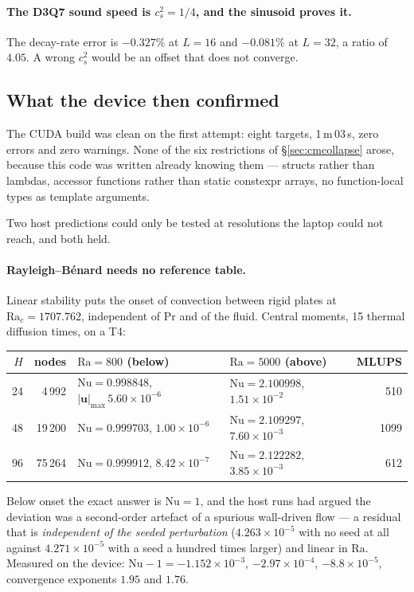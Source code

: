 \documentclass[11pt,a4paper]{article}
\newcommand{\cs}{c_s}
\newcommand{\uu}{\bm{u}}
\newcommand{\e}[1]{\times 10^{#1}}
\begin{document}
\paragraph{The D3Q7 sound speed is $\cs^2 = 1/4$, and the sinusoid proves it.}
The decay-rate error is $-0.327\%$ at $L=16$ and $-0.081\%$ at $L=32$, a ratio of
$4.05$. A wrong $\cs^2$ would be an offset that does not converge.

\subsection{What the device then confirmed}

The CUDA build was clean on the first attempt: eight targets, 1\,m\,03\,s, zero
errors and zero warnings. None of the six restrictions of \S\ref{sec:cmcollapse}
arose, because this code was written already knowing them --- structs rather than
lambdas, accessor functions rather than static constexpr arrays, no
function-local types as template arguments.

Two host predictions could only be tested at resolutions the laptop could not
reach, and both held.

\paragraph{Rayleigh--B\'enard needs no reference table.} Linear stability puts
the onset of convection between rigid plates at $\mathrm{Ra}_c = 1707.762$,
independent of $\mathrm{Pr}$ and of the fluid. Central moments, 15 thermal
diffusion times, on a T4:

\begin{center}\small
\begin{tabular}{rrllr}
\toprule
$H$ & nodes & $\mathrm{Ra}=800$ (below) & $\mathrm{Ra}=5000$ (above) & MLUPS \\
\midrule
24 & 4\,992  & $\mathrm{Nu}=0.998848$, $|\uu|_{\max}\,5.60\e{-6}$ & $\mathrm{Nu}=2.100998$, $1.51\e{-2}$ & 510 \\
48 & 19\,200 & $\mathrm{Nu}=0.999703$, $1.00\e{-6}$ & $\mathrm{Nu}=2.109297$, $7.60\e{-3}$ & 1099 \\
96 & 75\,264 & $\mathrm{Nu}=0.999912$, $8.42\e{-7}$ & $\mathrm{Nu}=2.122282$, $3.85\e{-3}$ & 612 \\
\bottomrule
\end{tabular}
\end{center}

Below onset the exact answer is $\mathrm{Nu}=1$, and the host runs had argued the
deviation was a second-order artefact of a spurious wall-driven flow --- a
residual that is \emph{independent of the seeded perturbation} ($4.263\e{-5}$
with no seed at all against $4.271\e{-5}$ with a seed a hundred times larger) and
linear in $\mathrm{Ra}$. Measured on the device: $\mathrm{Nu}-1 = -1.152\e{-3}$,
$-2.97\e{-4}$, $-8.8\e{-5}$, convergence exponents $1.95$ and $1.76$.
\end{document}
